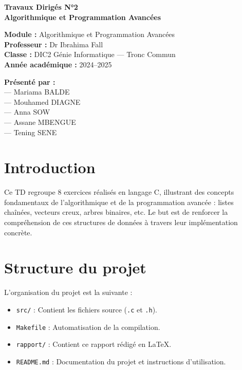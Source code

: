 \documentclass[a4paper,12pt]{article}
\begin{document}
\begin{titlepage}
    \centering
    \vspace*{2cm}
    
    {\Large\bfseries Travaux Dirigés N°2 \\[0.5cm]}
    {\LARGE\bfseries Algorithmique et Programmation Avancées\\[1cm]}
    
    \vfill
    
    \begin{flushleft}
    \textbf{Module :} Algorithmique et Programmation Avancées\\[0.3cm]
        \textbf{Professeur :} Dr Ibrahima Fall\\[0.3cm]
        \textbf{Classe :} DIC2 Génie Informatique — Tronc Commun\\[0.3cm]
        \textbf{Année académique :} 2024–2025
    \end{flushleft}
    
    \vfill
    
    \begin{flushright}
        \textbf{Présenté par :}\\
        — Mariama BALDE\\
        — Mouhamed DIAGNE\\
        — Anna SOW\\
        — Assane MBENGUE\\
        — Tening SENE
    \end{flushright}
    
    \vfill

    \vspace*{1cm}
\end{titlepage}





\tableofcontents
\newpage

\section{Introduction}
Ce TD regroupe 8 exercices réalisés en langage C, illustrant des concepts fondamentaux de l'algorithmique et de la programmation avancée : listes chaînées, vecteurs creux, arbres binaires, etc.  
Le but est de renforcer la compréhension de ces structures de données à travers leur implémentation concrète.

\section{Structure du projet}
L'organisation du projet est la suivante :
\begin{itemize}
    \item \texttt{src/} : Contient les fichiers source (\texttt{.c} et \texttt{.h}).
    \item \texttt{Makefile} : Automatisation de la compilation.
    \item \texttt{rapport/} : Contient ce rapport rédigé en \LaTeX.
    \item \texttt{README.md} : Documentation du projet et instructions d’utilisation.
\end{itemize}
\end{document}
